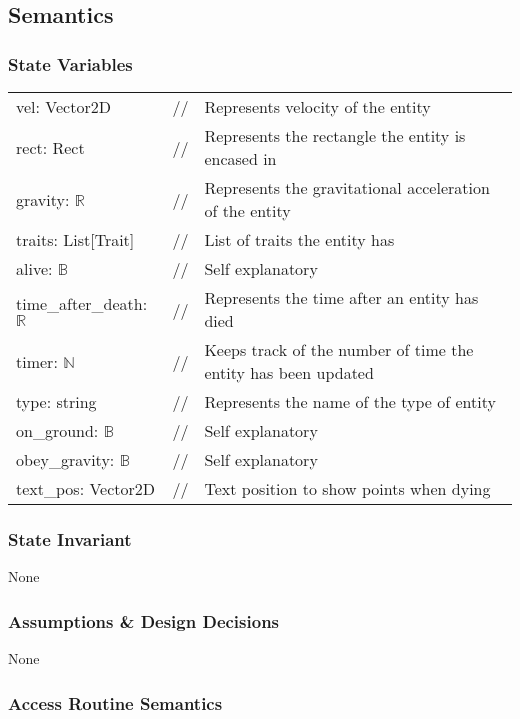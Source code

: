 \documentclass[12pt]{article}
\begin{document}
\subsection* {Semantics}

\subsubsection* {State Variables}
\begin{tabular}{lll}
vel: Vector2D & // & Represents velocity of the entity\\
rect: Rect & // & Represents the rectangle the entity is encased in\\
gravity: $\mathbb{R}$ & // & Represents the gravitational acceleration of the entity\\
traits: List[Trait] & // & List of traits the entity has\\
alive: $\mathbb{B}$ & // & Self explanatory\\
time\_after\_death: $\mathbb{R}$ & // & Represents the time after an entity has died\\
timer: $\mathbb{N}$ & // & Keeps track of the number of time the entity has been updated\\
type: string & // & Represents the name of the type of entity\\
on\_ground: $\mathbb{B}$ & // & Self explanatory\\
obey\_gravity: $\mathbb{B}$ & // & Self explanatory\\
\color{red}text\_pos: Vector2D & \color{red}// & \color{red}Text position to show points when dying\\
\end{tabular}

\subsubsection* {State Invariant}

None

\subsubsection* {Assumptions \& Design Decisions}

None

\subsubsection* {Access Routine Semantics}
\end{document}
